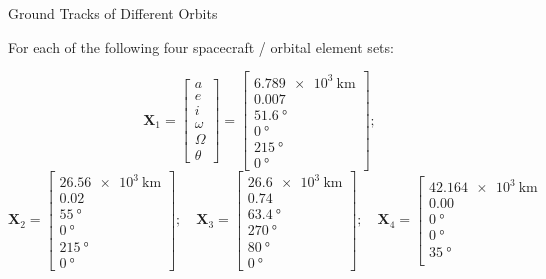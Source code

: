 \begin{hwkProblem}{3}{Ground Tracks of Different Orbits} \label{hwk:p03}

	For each of the following four spacecraft / orbital element sets:

	\[
		\boldsymbol{X}_1=\left[\begin{array}{c}
				a      \\
				e      \\
				i      \\
				\omega \\
				\Omega \\
				\theta
			\end{array}\right] = \left[\begin{array}{cc}
				\qty{6.789e3}{\km}  \\
				0.007               \\
				\qty{51.6}{\degree} \\
				\qty{0}{\degree}    \\
				\qty{215}{\degree}  \\
				\qty{0}{\degree}
			\end{array}\right];
	\]
	\[
		\boldsymbol{X}_2 = \left[\begin{array}{c}
				\qty{26.56e3}{\km} \\
				0.02               \\
				\qty{55}{\degree}  \\
				\qty{0}{\degree}   \\
				\qty{215}{\degree} \\
				\qty{0}{\degree}
			\end{array}\right]; \quad
		\boldsymbol{X}_3=\left[\begin{array}{c}
				\qty{26.6e3}{\km}   \\
				0.74                \\
				\qty{63.4}{\degree} \\
				\qty{270}{\degree}  \\
				\qty{80}{\degree}   \\
				\qty{0}{\degree}
			\end{array}\right]; \quad
		\boldsymbol{X}_4=\left[\begin{array}{c}
				\qty{42.164e3}{\km} \\
				0.00                \\
				\qty{0}{\degree}    \\
				\qty{0}{\degree}    \\
				\qty{35}{\degree}   \\

\end{array}\]
\end{hwkProblem}
